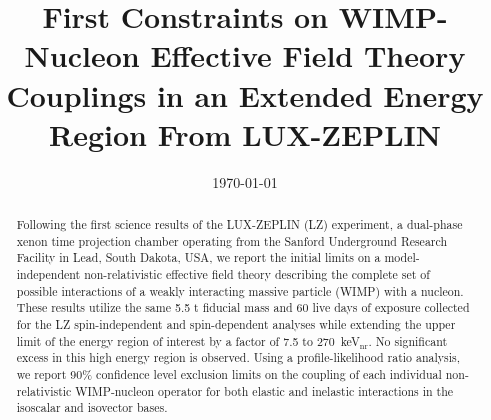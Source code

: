 \documentclass[reprint, showpacs,
preprintnumbers,
amsmath,amssymb,
aps, floatfix,
superscriptaddress,
prd, nofootinbib]{revtex4-1}
\begin{document}
\title{First Constraints on WIMP-Nucleon Effective Field Theory Couplings in an Extended Energy Region From LUX-ZEPLIN}


\date{\today}

\begin{abstract}
Following the first science results of the LUX-ZEPLIN (LZ) experiment, a dual-phase xenon time projection chamber operating from the Sanford Underground Research Facility in Lead, South Dakota, USA, we report the initial limits on a model-independent non-relativistic effective field theory describing the complete set of possible interactions of a weakly interacting massive particle (WIMP) with a nucleon. These results utilize the same 5.5 t fiducial mass and 60 live days of exposure collected for the LZ spin-independent and spin-dependent analyses while extending the upper limit of the energy region of interest by a factor of 7.5 to 270~keV$_\text{nr}$. No significant excess in this high energy region is observed. Using a profile-likelihood ratio analysis, we report 90\% confidence level exclusion limits on the coupling of each individual non-relativistic WIMP-nucleon operator for both elastic and inelastic interactions in the isoscalar and isovector bases.
\end{abstract}
    
\maketitle

\end{document}
